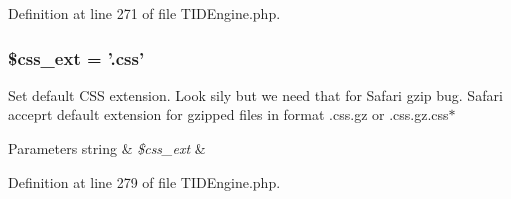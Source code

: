 Definition at line 271 of file TIDEngine.php.

\hypertarget{group__css__cache__settings_ga80329ee2b55f386978162762e84ac3ee}{
\subsubsection[{\$css\_\-ext}]{\setlength{\rightskip}{0pt plus 5cm}\$css\_\-ext = '.css'}}
\label{group__css__cache__settings_ga80329ee2b55f386978162762e84ac3ee}
Set default CSS extension. Look sily but we need that for Safari gzip bug. Safari acceprt default extension for gzipped files in format .css.gz or .css.gz.css$\ast$


\begin{DoxyParams}[1]{Parameters}
string & {\em \$css\_\-ext} & \\
\hline
\end{DoxyParams}


Definition at line 279 of file TIDEngine.php.

